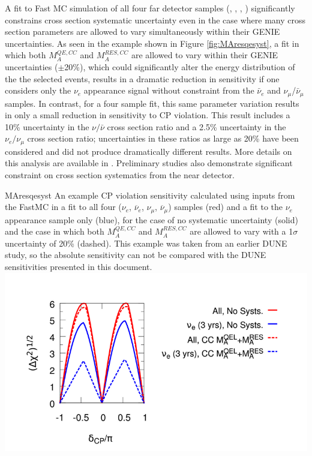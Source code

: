 A fit to Fast MC simulation of all four far detector samples
(\nue, \anue, \numu, \anumu) significantly
constrains cross section systematic uncertainty even in the case where many
cross section parameters are allowed to vary simultaneously within their
GENIE uncertainties. As seen in the example shown in Figure
\ref{fig:MAresqesyst}, 
a fit in which both $M_A^{QE,CC}$ and 
$M_A^{RES,CC}$ are allowed to vary within their GENIE uncertainties 
($\pm$20\%), which could significantly alter the energy distribution of the 
the selected events, results in a dramatic reduction in sensitivity if one 
considers only the $\nu_e$ appearance signal without constraint from the 
$\bar{\nu}_e$ and $\nu_{\mu}$/$\bar{\nu}_{\mu}$ samples.
In contrast, for a four sample fit,
this same parameter variation results in only a small reduction in
sensitivity to CP violation.
This result includes a 10\% uncertainty in the $\nu/\bar{\nu}$
cross section ratio and a 2.5\% uncertainty in the $\nu_e/\nu_{\mu}$
cross section ratio; uncertainties in these ratios as large as 20\% have
been considered and did not produce dramatically different results.
More details on this analysis are available in \cite{Bass:2014vta}.
Preliminary studies also demonstrate significant constraint on cross section systematics
from the near detector.
%
\begin{cdrfigure}{MAresqesyst}{
An example CP violation sensitivity calculated using inputs from the 
  FastMC in a fit to all four ($\nu_e$, $\overline\nu_e$, $\nu_{\mu}$, 
  $\overline\nu_{\mu}$) samples (red) and a fit to the $\nu_e$ appearance sample 
  only (blue), for the case of no systematic uncertainty (solid) and the case in
  which both $M_A^{QE,CC}$ and $M_A^{RES,CC}$ are allowed to vary with a
  1$\sigma$ uncertainty of 20\% (dashed). This example was taken from an earlier
  DUNE study, so the absolute sensitivity can not be compared with the DUNE 
  sensitivities presented in this document.}
\includegraphics[width=0.8\linewidth]{volume-physics/figures/CPV_MARESQE.png}
\end{cdrfigure}

